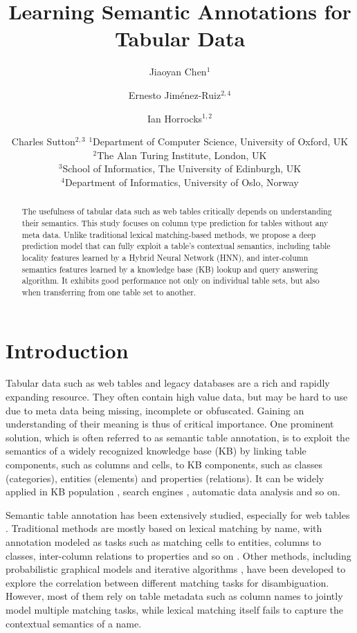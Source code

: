 \documentclass{article}
\title{
Learning Semantic Annotations for Tabular Data
}
\author{
Jiaoyan Chen$^{1}$ \and Ernesto Jim\'enez-Ruiz$^{2,4}$ \and Ian Horrocks$^{1,2}$ \and Charles Sutton$^{2,3}$
\affiliations
$^1$Department of Computer Science, University of Oxford, UK\\
$^2$The Alan Turing Institute, London, UK\\
$^3$School of Informatics, The University of Edinburgh,  UK\\
$^4$Department of Informatics, University of Oslo, Norway
}
\begin{document}
\maketitle

\begin{abstract}
The usefulness of tabular data such as web tables critically depends on
understanding their semantics.
This study focuses on column type prediction for tables without any meta data.
Unlike traditional lexical matching-based methods,
we propose a deep prediction model that can fully exploit a table's contextual semantics,
including table locality features learned by a Hybrid Neural Network (HNN),
and inter-column semantics features learned by a knowledge base (KB) lookup and query answering algorithm.
It exhibits good performance not only on individual table sets, but also
when transferring from one table set to another.

\end{abstract}

\section{Introduction}
Tabular data such as web tables and legacy databases are a rich and rapidly expanding resource.
They often contain high value data,
but may be hard to use
due to meta data being missing, incomplete or obfuscated. 
Gaining an understanding of their meaning is thus of critical importance.
One prominent solution, 
which is often 
referred to 
as semantic table annotation,
is to exploit the semantics of a widely recognized 
knowledge base (KB)
by linking table components, such as columns and cells, to KB components, 
such as classes (categories), entities (elements) and properties (relations).
It can be widely applied in KB population \cite{ritze2016profiling}, search engines \cite{cafarella2008webtables,cafarella2018ten}, automatic data analysis \cite{thirumuruganathan2018data,chu2015katara} and so on.


Semantic table annotation has been extensively studied, especially for web tables \cite{cafarella2018ten}.
Traditional methods are mostly based on lexical matching by name, 
with annotation modeled as tasks such as matching cells to entities, columns to classes, inter-column relations to properties and so on \cite{limaye2010annotating}.
Other methods, including probabilistic graphical models \cite{bhagavatula2015tabel} and iterative algorithms \cite{ritze2015matching}, have been developed to explore the correlation between different matching tasks for disambiguation.
However, most of them rely on table metadata such as column names to jointly model multiple matching tasks,
while lexical matching itself fails to capture the contextual semantics of a name.
\end{document}
